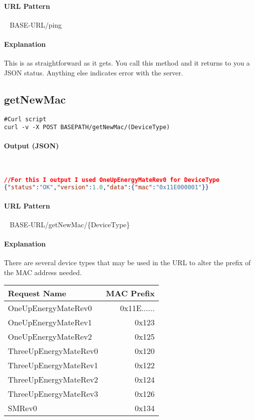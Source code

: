 \documentclass[
10pt, %
letterpaper, %
oneside, %
headinclude,footinclude, %
BCOR5mm, %
]{scrartcl}
\begin{document}
\paragraph{URL Pattern} 
~\newline
BASE-URL/ping

\paragraph{Explanation}
This is as straightforward as it gets. You call this method and it returns to you a JSON status. Anything else indicates error with the server.


\subsection{getNewMac}
\begin{lstlisting}
#Curl script 
curl -v -X POST BASEPATH/getNewMac/(DeviceType)
\end{lstlisting}

\paragraph{Output (JSON)}~
\begin{lstlisting}[language=json]
//For this I output I used OneUpEnergyMateRev0 for DeviceType
{"status":"OK","version":1.0,"data":{"mac":"0x11E000001"}}
\end{lstlisting}

\paragraph{URL Pattern} 
~\newline
BASE-URL/getNewMac/\{DeviceType\}

\paragraph{Explanation}
There are several device types that may be used in the URL to alter the prefix of the MAC address needed.
~\newline
\begin{tabular}{| l | r |}
\hline
\textbf{Request Name} & \textbf{MAC Prefix} \\
\hline
OneUpEnergyMateRev0 & 0x11E...... \\
OneUpEnergyMateRev1 & 0x123 \\
OneUpEnergyMateRev2 & 0x125 \\
ThreeUpEnergyMateRev0 & 0x120 \\
ThreeUpEnergyMateRev1 & 0x122 \\
ThreeUpEnergyMateRev2 & 0x124 \\
ThreeUpEnergyMateRev3 & 0x126 \\
SMRev0 & 0x134 \\
\hline
\end{tabular}
\end{document}
